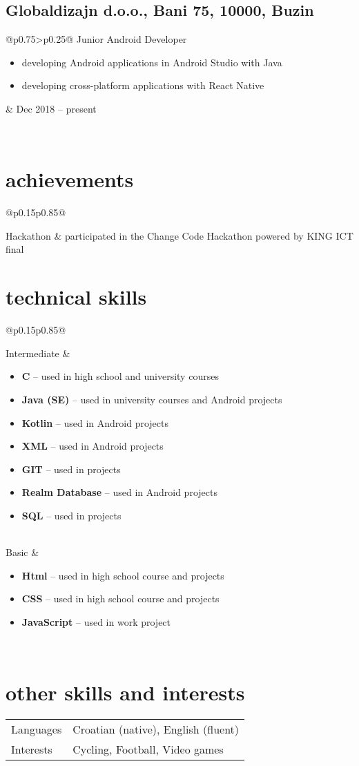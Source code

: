 \documentclass[a4paper]{article}
\makeatletter
\newlength{\tablewidth}
\newenvironment{period}[2]{%
\newcommand{\sarma}{#2}%
\setlength{\tablewidth}{\linewidth}
\addtolength{\tablewidth}{-2\tabcolsep}
\begin{tabular}{@{}p{0.75\tablewidth}>{\raggedleft\arraybackslash}p{0.25\tablewidth}@{}}%
#1 \newline
\begin{itemize}
}{%
\end{itemize} & \sarma \\%
\end{tabular}\\
}
\newenvironment{skills}{%
\setlength{\tablewidth}{\linewidth}
\addtolength{\tablewidth}{-2\tabcolsep}
\begin{tabular}{@{}p{0.15\tablewidth}p{0.85\tablewidth}@{}}
}{%
\end{tabular}
}
\makeatother
\begin{document}
\subsection{Globaldizajn d.o.o., Bani 75, 10000, Buzin }
\begin{period}{Junior Android Developer}{Dec 2018 -- present}
    \item developing Android applications in Android Studio with Java
    \item developing cross-platform applications with React Native
\end{period}

\section{achievements}
\begin{skills}
    Hackathon   &   participated in the Change Code Hackathon powered by KING ICT final 
\end{skills}

\section{technical skills}
\begin{skills}
    Intermediate &
    \begin{itemize}
    	\item \textbf{C} -- used in high school and university courses
        \item \textbf{Java (SE)} -- used in university courses and Android projects
        \item \textbf{Kotlin} -- used in Android projects
        \item \textbf{XML} -- used in Android projects
        \item \textbf{GIT} -- used in projects
        \item \textbf{Realm Database} -- used in Android projects
        \item \textbf{SQL} -- used in projects
    \end{itemize} \\
    Basic &
    \begin{itemize}
        \item \textbf{Html} -- used in high school course and projects
        \item \textbf{CSS} -- used in high school course and projects
        \item \textbf{JavaScript} -- used in work project
    \end{itemize} \\
\end{skills}

\section{other skills and interests}
\begin{skills}
    Languages & Croatian (native), English (fluent)\\
    Interests & Cycling, Football, Video games \\
\end{skills}
\end{document}
